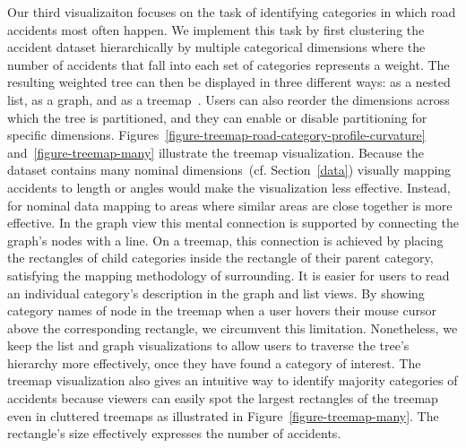 Our third visualizaiton focuses on the task of identifying categories in which road accidents most often happen. We implement this task by first clustering the accident dataset hierarchically by multiple categorical dimensions where the number of accidents that fall into each set of categories represents a weight. The resulting weighted tree can then be displayed in three different ways: \Ni as a nested list, \Nii as a graph, and \Niii as a treemap~\cite{Shneiderman1992}.
Users can also reorder the dimensions across which the tree is partitioned, and they can enable or disable partitioning for specific dimensions.
Figures~\ref{figure-treemap-road-category-profile-curvature} and~\ref{figure-treemap-many} illustrate the treemap visualization.
Because the dataset contains many nominal dimensions~(cf. Section~\ref{data}) visually mapping accidents to length or angles would make the visualization less effective. Instead, for nominal data mapping to areas where similar areas are close together is more effective.
In the graph view this mental connection is supported by connecting the graph's nodes with a line. On a treemap, this connection is achieved by placing the rectangles of child categories inside the rectangle of their parent category, satisfying the mapping methodology of surrounding.
It is easier for users to read an individual category's description in the graph and list views. By showing category names of node in the treemap when a user hovers their mouse cursor above the corresponding rectangle, we circumvent this limitation.
Nonetheless, we keep the list and graph visualizations to allow users to traverse the tree's hierarchy more effectively, once they have found a category of interest.
The treemap visualization also gives an intuitive way to identify majority categories of accidents because viewers can easily spot the largest rectangles of the treemap even in cluttered treemaps as illustrated in Figure~\ref{figure-treemap-many}. The rectangle's size effectively expresses the number of accidents.

